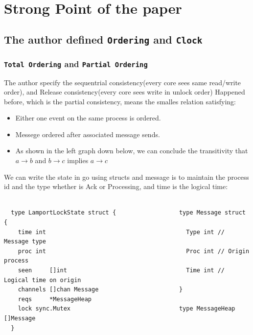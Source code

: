 \documentclass[acmlarge]{acmart}
\begin{document}



\maketitle

\section{Strong Point of the paper}


\subsection {The author defined \texttt{Ordering} and \texttt{Clock}}
\subsubsection{\texttt{Total Ordering} and \texttt{Partial Ordering}}
The author specify the sequentrial consistency(every core sees same read/write order), and Release consistency(every core sees write in unlock order)
Happened before, which is the partial consistency, means the smalles relation satisfying:
\begin{itemize}
  \item Either one event on the same process is ordered.
  \item Messege ordered after associated message sends.
  \item As shown in the left graph down below, we can conclude the
        transitivity that $a \rightarrow b$ and $b \rightarrow c$ implies $a \rightarrow c$
\end{itemize}

We can write the state in go using structs and message is to maintain the process id and the type whether is Ack or Processing,
and time is the logical time:

\begin{lstlisting}

  type LamportLockState struct {                  type Message struct {
    time int                                      	Type int // Message type
    proc int                                      	Proc int // Origin process
    seen     []int                                	Time int // Logical time on origin
    channels []chan Message                       }
    reqs     *MessageHeap                         
    lock sync.Mutex                               type MessageHeap []Message
  }                 
  \end{lstlisting}
\end{document}
